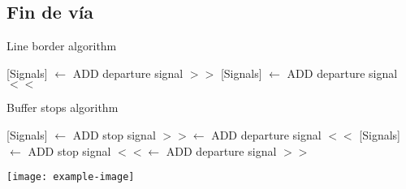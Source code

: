 \subsection{Fin de vía}

\lipsum[1]

\begin{algorithm}[hbt!]
    \caption{Line border algorithm}\label{alg:lineBorder}
    \DontPrintSemicolon
    \SetNoFillComment
    \LinesNotNumbered 
    {
        {
            {
                [Signals] $\gets$ ADD departure signal $>>$\;
            }
            {
                [Signals] $\gets$ ADD departure signal $<<$\;
            }
        }
    }
    \KwResult{[Signals]} 
\end{algorithm}

\lipsum[1]

\begin{algorithm}[hbt!]
    \caption{Buffer stops algorithm}\label{alg:bufferStop}
    \DontPrintSemicolon
    \SetNoFillComment
    \LinesNotNumbered 
    {
        {
            [Signals] $\gets$ ADD stop signal $>>$\;
            [Signals] $\gets$ ADD departure signal $<<$\;
        }
        {
            [Signals] $\gets$ ADD stop signal $<<$\;
            [Signals] $\gets$ ADD departure signal $>>$\;
        }
    }
    \KwResult{[Signals]} 
\end{algorithm}

\lipsum[1]
\texttt{[image: example-image]}\\
\lipsum[1-2]
